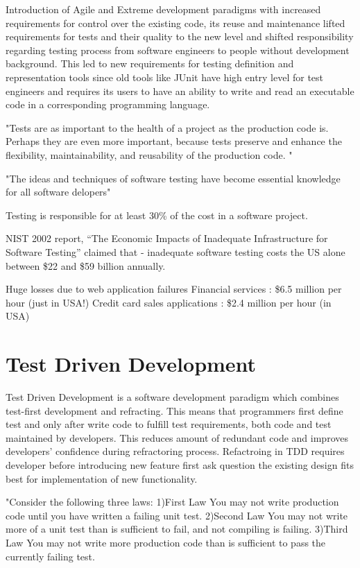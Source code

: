 Introduction of Agile and Extreme development paradigms with increased requirements for control over the existing code, its reuse and maintenance lifted requirements for tests and their quality to the new level and shifted responsibility regarding testing process from software engineers to people without development background. 
This led to new requirements for testing definition and representation tools since old tools like JUnit have high entry level for test engineers and requires its users to have an ability to write and read an executable code in a corresponding programming language.

"Tests are as important to the health of a project as the production code is. 
Perhaps they are even more important, because tests preserve and enhance the flexibility, maintainability, and reusability of the production code. "\cite{MartinClean}

"The ideas and techniques of software testing have become essential knowledge for all software delopers"\cite{IntroductionST}

Testing is responsible for at least 30\% of the cost in a software project.\cite{Lecture2}

NIST 2002 report, “The Economic Impacts of Inadequate Infrastructure for Software Testing” claimed that - inadequate software testing costs the US alone between \$22 and \$59 billion annually. \cite{Lecture1}

Huge losses due to web application failures
Financial services : \$6.5 million per hour (just in USA!)
Credit card sales applications : \$2.4 million per hour (in USA)
\cite{Lecture1}

\section{Test Driven Development}

Test Driven Development is a software development paradigm which combines test-first development and refracting. This means that programmers first define test and only after write code to fulfill test requirements, both code and test maintained by developers. This reduces amount of redundant code and improves developers' confidence during refractoring process.
Refactroing in TDD requires developer before introducing new feature first ask question the existing design fits best for implementation of new functionality.\cite{tdd} \cite{TDDPractical}

"Consider the following three laws:
1)First Law You may not write production code until you have written a failing unit test.
2)Second Law You may not write more of a unit test than is sufficient to fail, and not compiling is failing.
3)Third Law You may not write more production code than is sufficient to pass the currently failing test.

